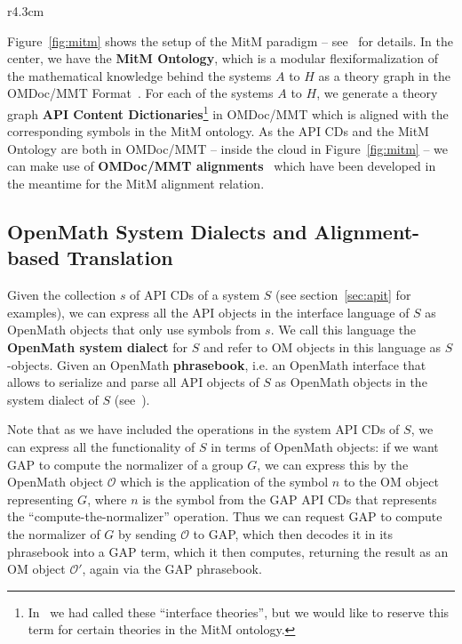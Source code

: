 \begin{wrapfigure}r{4.3cm}\vspace*{-2em}
  \vspace*{-1em}
  \caption{MitM Paradigm}\label{fig:mitm}\vspace*{-1.5em}
\end{wrapfigure}
Figure~\ref{fig:mitm} shows the setup of the MitM paradigm -- see~\cite{DehKohKon:iop16}
for details. In the center, we have the \textbf{MitM Ontology}, which is a modular
flexiformalization of the mathematical knowledge behind the systems $A$ to $H$ as a theory
graph in the OMDoc/MMT Format~\cite{Kohlhase:OMDoc1.2,RabKoh:WSMSML13,uniformal:on}. For
each of the systems $A$ to $H$, we generate a theory graph \textbf{API Content
  Dictionaries}\footnote{In~\cite{DehKohKon:iop16} we had called these ``interface
  theories'', but we would like to reserve this term for certain theories in the MitM
  ontology.}
in OMDoc/MMT which is aligned with the corresponding symbols in the MitM ontology. As the
API CDs and the MitM Ontology are both in OMDoc/MMT -- inside the cloud in
Figure~\ref{fig:mitm} -- we can make use of \textbf{OMDoc/MMT
  alignments}~\cite{MueGauKal:cacfms17} which have been developed in the meantime for the
MitM alignment relation.

\subsection{OpenMath System Dialects and Alignment-based Translation}\label{sec:mitm:dialect}

Given the collection $s$ of API CDs of a system $S$ (see section~\ref{sec:apit} for
examples), we can express all the API objects in the interface language of $S$ as OpenMath
objects that only use symbols from $s$. 
We call this language the \textbf{OpenMath system dialect} for $S$ and refer to OM objects in this language as $S$-objects. 
Given an OpenMath \textbf{phrasebook}, i.e. an OpenMath interface that allows to serialize
and parse all API objects of $S$ as OpenMath objects in the system dialect of $S$ (see~\cite[Section
1.5]{BusCapCar:2oms04}).

Note that as we have included the operations in the system API CDs of $S$, we can express all the functionality of $S$ in terms of OpenMath objects: if we want GAP to compute the normalizer of a group $G$, we can express this by the OpenMath object $\mathcal{O}$ which is the application of the symbol $n$ to the OM object representing $G$, where $n$ is the symbol from the GAP API CDs that represents the ``compute-the-normalizer'' operation. 
Thus we can request GAP to compute the normalizer of $G$ by sending $\mathcal{O}$ to GAP, which then decodes it in its phrasebook into a GAP term, which it then computes, returning the result as an OM object $\mathcal{O}'$, again via the GAP phrasebook.

